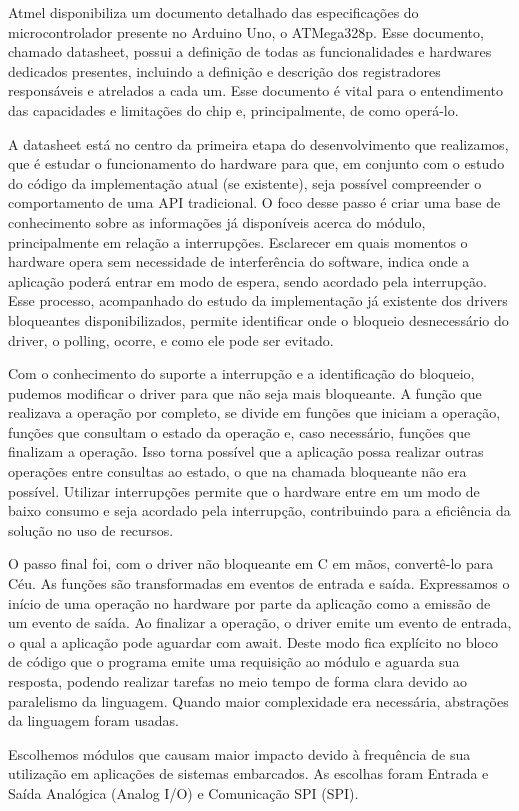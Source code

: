 \documentclass[11pt]{article}
\begin{document}
\par Atmel disponibiliza um documento detalhado \cite{atmegadatasheet} das especificações do microcontrolador presente no Arduino Uno, o ATMega328p. Esse documento, chamado datasheet, possui a definição de todas as funcionalidades e hardwares dedicados presentes, incluindo a definição e descrição dos registradores responsáveis e atrelados a cada um. Esse documento é vital para o entendimento das capacidades e limitações do chip e, principalmente, de como operá-lo.
\par A datasheet está no centro da primeira etapa do desenvolvimento que realizamos, que é estudar o funcionamento do hardware para que, em conjunto com o estudo do código da implementação atual (se existente), seja possível compreender o comportamento de uma API tradicional. O foco desse passo é criar uma base de conhecimento sobre as informações já disponíveis acerca do módulo, principalmente em relação a interrupções. Esclarecer em quais momentos o hardware opera sem necessidade de interferência do software, indica onde a aplicação poderá entrar em modo de espera, sendo acordado pela interrupção. Esse processo, acompanhado do estudo da implementação já existente dos drivers bloqueantes disponibilizados, permite identificar onde o bloqueio desnecessário do driver, o polling, ocorre, e como ele pode ser evitado.
\par Com o conhecimento do suporte a interrupção e a identificação do bloqueio, pudemos modificar o driver para que não seja mais bloqueante. A função que realizava a operação por completo, se divide em funções que iniciam a operação, funções que consultam o estado da operação e, caso necessário, funções que finalizam a operação. Isso torna possível que a aplicação possa realizar outras operações entre consultas ao estado, o que na chamada bloqueante não era possível. Utilizar interrupções permite que o hardware entre em um modo de baixo consumo e seja acordado pela interrupção, contribuindo para a eficiência da solução no uso de recursos.
\par O passo final foi, com o driver não bloqueante em C em mãos, convertê-lo para Céu. As funções são transformadas em eventos de entrada e saída. Expressamos o início de uma operação no hardware por parte da aplicação como a emissão de um evento de saída. Ao finalizar a operação, o driver emite um evento de entrada, o qual a aplicação pode aguardar com await. Deste modo fica explícito no bloco de código que o programa emite uma requisição ao módulo e aguarda sua resposta, podendo realizar tarefas no meio tempo de forma clara devido ao paralelismo da linguagem. Quando maior complexidade era necessária, abstrações da linguagem foram usadas.
\par Escolhemos módulos que causam maior impacto devido à frequência de sua utilização em aplicações de sistemas embarcados. As escolhas foram Entrada e Saída Analógica (Analog I/O) e Comunicação SPI (SPI).
\end{document}
